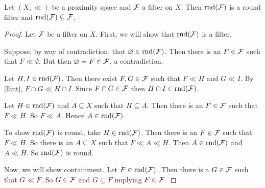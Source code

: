 \begin{proposition}
	\label{rndround}
	Let \( (X,\ll) \) be a proximity space and \( \mathcal{F} \) a filter on \( X \).  Then \( \operatorname{rnd}(\mathcal{F}) \) is a round filter and \( \operatorname{rnd}(\mathcal{F}) \subseteq \mathcal{F} \).
\end{proposition}
\begin{proof}
	Let \( \mathcal{F} \) be a filter on \( X \).  First, we will show that \( \operatorname{rnd}(\mathcal{F}) \) is a filter.
	
	Suppose, by way of contradiction, that \( \varnothing \in \operatorname{rnd}(\mathcal{F}) \).  Then there is an \( F \in \mathcal{F} \) such that \( F \ll \emptyset \).  But then \( \varnothing = F \in \mathcal{F} \), a contradiction.
	
	Let \( H,I \in \operatorname{rnd}(\mathcal{F}) \).  Then there exist \( F,G \in \mathcal{F} \) such that \( F \ll H \) and \( G \ll I \).  By \ref{llint}, \( F \cap G \ll H \cap I \).  Since \( F \cap G \in \mathcal{F} \) then \( H \cap I \in \operatorname{rnd}(\mathcal{F}) \).
	
	Let \( H \in \operatorname{rnd}(\mathcal{F}) \) and \( A \subseteq X \) such that \( H \subseteq A \).  Then there is an \( F \in \mathcal{F} \) such that \( F \ll H \).  So \( F \ll A \).  Hence \( A \in \operatorname{rnd}(\mathcal{F}) \).
	
	To show \( \operatorname{rnd}(\mathcal{F}) \) is round, take \( H \in \operatorname{rnd}(\mathcal{F}) \).  Then there is an \( F \in \mathcal{F} \) such that \( F \ll H \).  So there is an \( A \subseteq X \) such that \( F \ll A \ll H \).  Then \( A \in \operatorname{rnd}(\mathcal{F}) \) and \( A \ll H \).  So \( \operatorname{rnd}(\mathcal{F}) \) is round.
	
	Now, we will show containment.  Let \( F \in \operatorname{rnd}(\mathcal{F}) \).  Then there is a \( G \in \mathcal{F} \) such that \( G \ll F \).  So \( G \in \mathcal{F} \) and \( G \subseteq F \) implying \( F \in \mathcal{F} \).
\end{proof}

